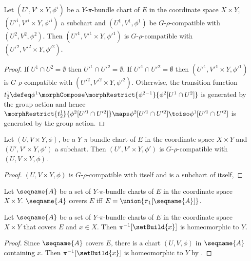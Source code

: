 \documentclass{article}
\begin{document}
\begin{lemma}
Let $(U^i, V^i \times Y, \phi^i)$ be a $Y$-$\pi$-bundle chart of $E$ in
the coordinate space $X \times Y$, $(U'^i, V'^i \times Y, \phi'^i)$ a
subchart and $(U^1, V^1, \phi^1)$ be $G$-$\rho$-compatible with
$(U^2, V^2, \phi^2)$.  Then $(U'^1, V'^1 \times Y, \phi'^1)$ is
$G$-$\rho$-compatible with $(U'^2, V'^2 \times Y, \phi'^2)$.

\begin{proof}
If $U^1 \cap U^2 = \emptyset$ then $U'^1 \cap U'^2 = \emptyset$. If
\nobreaks
{{
  $U'^1 \cap U'^2 = \emptyset$
}}
then
\nobreaks
{{
  $(U'^1, V'^1 \times Y, \phi'^1)$
}}
is $G$-$\rho$-compatible with $(U'^2, V'^2 \times Y, \phi'^2)$. Otherwise,
the transition function
\nobreaks
{{
  $
    t^1_2 \defeq
    \phi^1 \morphCompose \morphRestrict{\phi^{2-1}}{\phi^2[U^1 \cap U^2]}
  $
}}
is generated by the group action and hence
\nobreaks
{{
  $
    \morphRestrict{t^1_2}{\phi^2[U'^1 \cap U'^2]}
    \maps
    \phi^2[U'^1 \cap U'^2]
    \toiso
    \phi^1[U'^1 \cap U'^2]
  $
}}
is generated by the group action.
\end{proof}
\end{lemma}

\begin{corollary}
Let $(U, V \times Y, \phi)$, be a $Y$-$\pi$-bundle chart of $E$ in the
coordinate space $X \times Y$ and $(U', V' \times Y, \phi')$ a subchart.
Then $(U', V' \times Y, \phi')$ is $G$-$\rho$-compatible with
$(U, V \times Y, \phi)$.

\begin{proof}
$(U, V \times Y, \phi)$ is $G$-$\rho$-compatible with itself and is a
subchart of itself,
\end{proof}
\end{corollary}

\begin{definition}
Let $\seqname{A}$ be a set of $Y$-$\pi$-bundle
charts of $E$ in the coordinate space $X \times Y$.
$\seqname{A}$ covers $E$ iff $E = \union{{\pi_1[\seqname{A}]}}$.
\end{definition}

\begin{lemma}
Let $\seqname{A}$ be a set of $Y$-$\pi$-bundle charts of $E$ in the
coordinate space $X \times Y$ that covers $E$ and $x \in X$. Then
$\pi^{-1}[\setBuild{x}]$ is homeomorphic to $Y$.
\begin{proof}
Since $\seqname{A}$ covers $E$, there is a chart $(U, V, \phi)$ in
$\seqname{A}$ containing $x$.
Then $\pi^{-1}[\setBuild{x}]$ is homeomorphic to $Y$ by
.
\end{proof}
\end{lemma}
\end{document}
